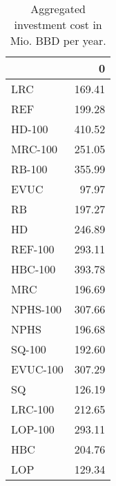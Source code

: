 \begin{table}
\centering
\caption{Aggregated investment cost in Mio. BBD per year.}
\label{tab:agg_invest_cost}
\begin{tabular}{lr}
\toprule
{} &      0 \\
\midrule
LRC      & 169.41 \\
REF      & 199.28 \\
HD-100   & 410.52 \\
MRC-100  & 251.05 \\
RB-100   & 355.99 \\
EVUC     & 97.97 \\
RB       & 197.27 \\
HD       & 246.89 \\
REF-100  & 293.11 \\
HBC-100  & 393.78 \\
MRC      & 196.69 \\
NPHS-100 & 307.66 \\
NPHS     & 196.68 \\
SQ-100   & 192.60 \\
EVUC-100 & 307.29 \\
SQ       & 126.19 \\
LRC-100  & 212.65 \\
LOP-100  & 293.11 \\
HBC      & 204.76 \\
LOP      & 129.34 \\
\bottomrule
\end{tabular}
\end{table}
